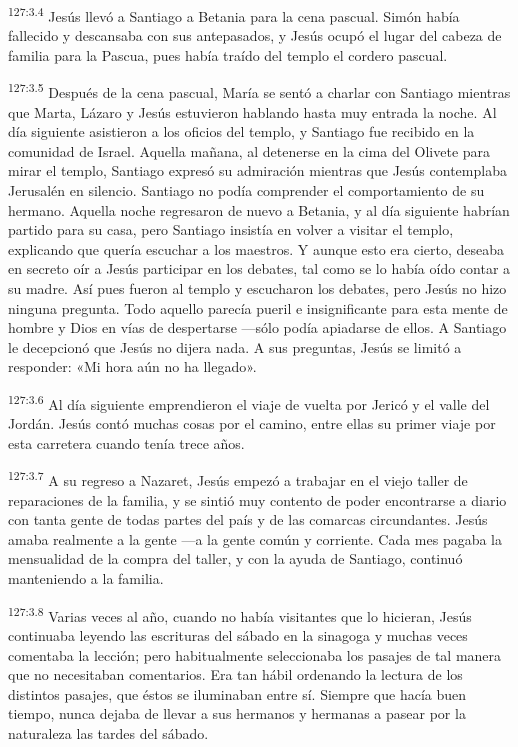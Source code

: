 \par
\textsuperscript{127:3.4} Jesús llevó a Santiago a Betania para la cena pascual. Simón había fallecido y descansaba con sus antepasados, y Jesús ocupó el lugar del cabeza de familia para la Pascua, pues había traído del templo el cordero pascual.

\par
\textsuperscript{127:3.5} Después de la cena pascual, María se sentó a charlar con Santiago mientras que Marta, Lázaro y Jesús estuvieron hablando hasta muy entrada la noche. Al día siguiente asistieron a los oficios del templo, y Santiago fue recibido en la comunidad de Israel. Aquella mañana, al detenerse en la cima del Olivete para mirar el templo, Santiago expresó su admiración mientras que Jesús contemplaba Jerusalén en silencio. Santiago no podía comprender el comportamiento de su hermano. Aquella noche regresaron de nuevo a Betania, y al día siguiente habrían partido para su casa, pero Santiago insistía en volver a visitar el templo, explicando que quería escuchar a los maestros. Y aunque esto era cierto, deseaba en secreto oír a Jesús participar en los debates, tal como se lo había oído contar a su madre. Así pues fueron al templo y escucharon los debates, pero Jesús no hizo ninguna pregunta. Todo aquello parecía pueril e insignificante para esta mente de hombre y Dios en vías de despertarse ---sólo podía apiadarse de ellos. A Santiago le decepcionó que Jesús no dijera nada. A sus preguntas, Jesús se limitó a responder: «Mi hora aún no ha llegado».

\par
\textsuperscript{127:3.6} Al día siguiente emprendieron el viaje de vuelta por Jericó y el valle del Jordán. Jesús contó muchas cosas por el camino, entre ellas su primer viaje por esta carretera cuando tenía trece años.

\par
\textsuperscript{127:3.7} A su regreso a Nazaret, Jesús empezó a trabajar en el viejo taller de reparaciones de la familia, y se sintió muy contento de poder encontrarse a diario con tanta gente de todas partes del país y de las comarcas circundantes. Jesús amaba realmente a la gente ---a la gente común y corriente. Cada mes pagaba la mensualidad de la compra del taller, y con la ayuda de Santiago, continuó manteniendo a la familia.

\par
\textsuperscript{127:3.8} Varias veces al año, cuando no había visitantes que lo hicieran, Jesús continuaba leyendo las escrituras del sábado en la sinagoga y muchas veces comentaba la lección; pero habitualmente seleccionaba los pasajes de tal manera que no necesitaban comentarios. Era tan hábil ordenando la lectura de los distintos pasajes, que éstos se iluminaban entre sí. Siempre que hacía buen tiempo, nunca dejaba de llevar a sus hermanos y hermanas a pasear por la naturaleza las tardes del sábado.

